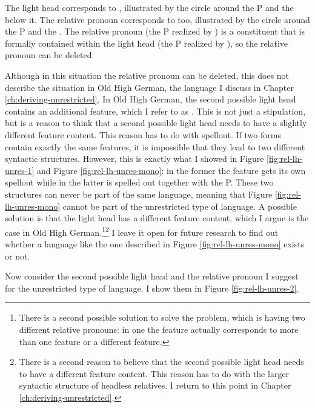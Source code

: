 The light head corresponds to , illustrated by the circle around the P and the  below it. The relative pronoun corresponds to  too, illustrated by the circle around the P and the . The relative pronoun (the P realized by ) is a constituent that is formally contained within the light head (the P realized by ), so the relative pronoun can be deleted.

Although in this situation the relative pronoun can be deleted, this does not describe the situation in Old High German, the language I discuss in Chapter \ref{ch:deriving-unrestricted}. In Old High German, the second possible light head contains an additional feature, which I refer to as .
This is not just a stipulation, but is a reason to think that a second possible light head needs to have a slightly different feature content. This reason has to do with spellout. If two forms contain exactly the same features, it is impossible that they lead to two different syntactic structures. However, this is exactly what I showed in Figure \ref{fig:rel-lh-unres-1} and Figure \ref{fig:rel-lh-unres-mono}: in the former the feature  gets its own spellout while in the latter  is spelled out together with the P. These two structures can never be part of the same language, meaning that Figure \ref{fig:rel-lh-unres-mono} cannot be part of the unrestricted type of language. A possible solution is that the light head has a different feature content, which I argue is the case in Old High German.\footnote{
There is a second possible solution to solve the problem, which is having two different relative pronouns: in one the feature  actually corresponds to more than one feature or a different feature.
}\footnote{
There is a second reason to believe that the second possible light head needs to have a different feature content. This reason has to do with the larger syntactic structure of headless relatives. I return to this point in Chapter \ref{ch:deriving-unrestricted}.
}
I leave it open for future research to find out whether a language like the one described in Figure \ref{fig:rel-lh-unres-mono} exists or not.

Now consider the second possible light head and the relative pronoun I suggest for the unrestricted type of language. I show them in Figure \ref{fig:rel-lh-unres-2}.

